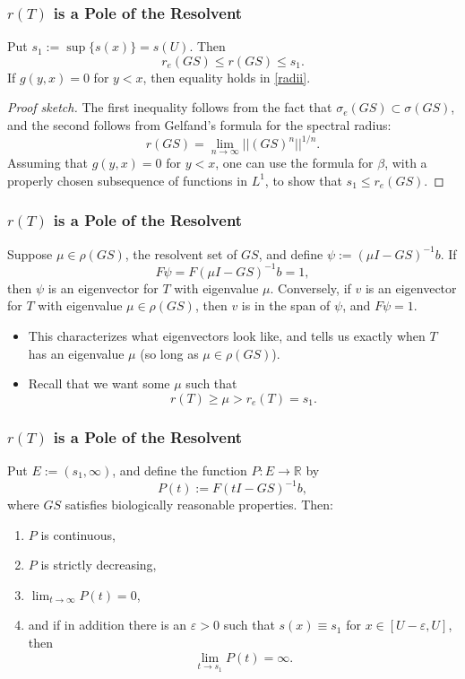 \documentclass{beamer}
\newcommand{\R}{\mathbb{R}}
\newcommand{\ee}{{\varepsilon}}
\begin{document}
\begin{frame}
	\frametitle{$r(T)$ is a Pole of the Resolvent}
		\begin{theorem}[R., 2018]
			Put $s_1:= \sup\{s(x)\} = s(U)$. Then
			\begin{equation}
				r_e(GS) \leq r(GS) \leq s_1. \label{radii}
			\end{equation}
			If $g(y, x) = 0$ for $y < x$, then equality holds in \eqref{radii}.
		\end{theorem}
	\pause
	\begin{proof}[Proof sketch]
		The first inequality follows from the fact that $\sigma_e(GS) \subset \sigma(GS)$, and the second follows from Gelfand's formula for the spectral radius:
		\[r(GS) = \lim_{n \to \infty} ||(GS)^n||^{1/n}.\] \pause Assuming that $g(y, x) = 0$ for $y < x$, one can use the formula for $\beta$, with a properly chosen subsequence of functions in $L^1$, to show that $s_1 \leq r_e(GS)$.		
	\end{proof}
\end{frame}

\begin{frame}
	\frametitle{$r(T)$ is a Pole of the Resolvent}
	\begin{theorem}
		Suppose $\mu \in \rho(GS)$, the resolvent set of $GS$, and define $\psi:=(\mu I - GS)^{-1} b$. If
		\[F \psi = F(\mu I - GS)^{-1} b = 1,\]
		\pause
		then $\psi$ is an eigenvector for $T$ with eigenvalue $\mu$.
		\pause
		Conversely, if $v$ is an eigenvector for $T$ with eigenvalue $\mu \in \rho(GS)$, then $v$ is in the span of $\psi$, and $F \psi = 1$.
	\end{theorem}
	\pause
	\begin{itemize}
	\item This characterizes what eigenvectors look like, and tells us exactly when $T$ has an eigenvalue $\mu$ (so long as $\mu \in \rho(GS)$).
	\pause
	\item Recall that we want some $\mu$ such that
	\[r(T) \geq \mu > r_e(T) = s_1.\]
	\end{itemize}
\end{frame}

\begin{frame}
	\frametitle{$r(T)$ is a Pole of the Resolvent}
	\begin{theorem}[R., 2019]
		Put $E:=(s_1, \infty)$, and define the function $P:E \to \R$ by
		\[P(t):= F(t I - GS)^{-1}b,\]
		where $GS$ satisfies biologically reasonable properties. Then:
		\pause
		\begin{enumerate}
			\item $P$ is continuous,
			\pause
			\item $P$ is strictly decreasing,
			\pause
			\item $\lim_{t \to \infty} P(t) = 0$,
			\pause
			\item and if in addition there is an $\ee > 0$ such that $s(x) \equiv s_1$ for $x \in [U-\ee, U]$, then
			\[\lim_{t \to s_1} P(t) = \infty.\]
		\end{enumerate}
	\end{theorem}
\end{frame}
\end{document}

